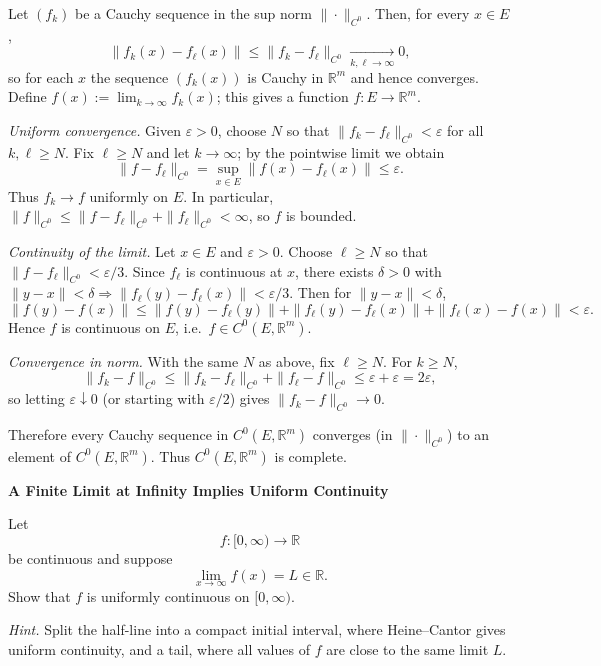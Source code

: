 \begin{solution}
Let $(f_k)$ be a Cauchy sequence in the sup norm $\|\cdot\|_{C^0}$.
	Then, for every $x\in E$,
	\[
	\|f_k(x)-f_\ell(x)\|\le \|f_k-f_\ell\|_{C^0}\xrightarrow[k,\ell\to\infty]{} 0,
	\]
	so for each $x$ the sequence $(f_k(x))$ is Cauchy in $\mathbb{R}^m$ and hence converges. Define
	$f(x):=\lim_{k\to\infty}f_k(x)$; this gives a function $f:E\to\mathbb{R}^m$.

	\emph{Uniform convergence.} Given $\varepsilon>0$, choose $N$ so that $\|f_k-f_\ell\|_{C^0}<\varepsilon$ for
	all $k,\ell\ge N$. Fix $\ell\ge N$ and let $k\to\infty$; by the pointwise limit we obtain
	\[
	\|f-f_\ell\|_{C^0}=\sup_{x\in E}\|f(x)-f_\ell(x)\|\le \varepsilon.
	\]
	Thus $f_k\to f$ uniformly on $E$. In particular, $\|f\|_{C^0}\le \|f-f_\ell\|_{C^0}+\|f_\ell\|_{C^0}<\infty$, so $f$ is bounded.

	\emph{Continuity of the limit.} Let $x\in E$ and $\varepsilon>0$. Choose $\ell\ge N$ so that
	$\|f-f_\ell\|_{C^0}<\varepsilon/3$. Since $f_\ell$ is continuous at $x$, there exists $\delta>0$ with
	$\|y-x\|<\delta\Rightarrow \|f_\ell(y)-f_\ell(x)\|<\varepsilon/3$. Then for $\|y-x\|<\delta$,
	\[
	\|f(y)-f(x)\|\le \|f(y)-f_\ell(y)\|+\|f_\ell(y)-f_\ell(x)\|+\|f_\ell(x)-f(x)\|<\varepsilon.
	\]
	Hence $f$ is continuous on $E$, i.e.\ $f\in C^0(E,\mathbb{R}^m)$.

	\emph{Convergence in norm.} With the same $N$ as above, fix $\ell\ge N$. For $k\ge N$,
	\[
	\|f_k-f\|_{C^0}\le \|f_k-f_\ell\|_{C^0}+\|f_\ell-f\|_{C^0}\le \varepsilon+\varepsilon=2\varepsilon,
	\]
	so letting $\varepsilon\downarrow 0$ (or starting with $\varepsilon/2$) gives $\|f_k-f\|_{C^0}\to 0$.

	Therefore every Cauchy sequence in $C^0(E,\mathbb{R}^m)$ converges (in $\|\cdot\|_{C^0}$) to an element of
	$C^0(E,\mathbb{R}^m)$. Thus $C^0(E,\mathbb{R}^m)$ is complete.
\end{solution}

\begin{problem}[CP-II-0523]
\label{prob:cp-ii-0523}
\textbf{A Finite Limit at Infinity Implies Uniform Continuity}

\hspace*{1.5em}Let
\[
f:[0,\infty)\to\mathbb R
\]
be continuous and suppose
\[
\lim_{x\to\infty}f(x)=L\in\mathbb R.
\]
Show that \(f\) is uniformly continuous on \([0,\infty)\).

\medskip
\noindent\emph{Hint.} Split the half-line into a compact initial interval, where Heine--Cantor gives
uniform continuity, and a tail, where all values of \(f\) are close to the
same limit \(L\).
\end{problem}

